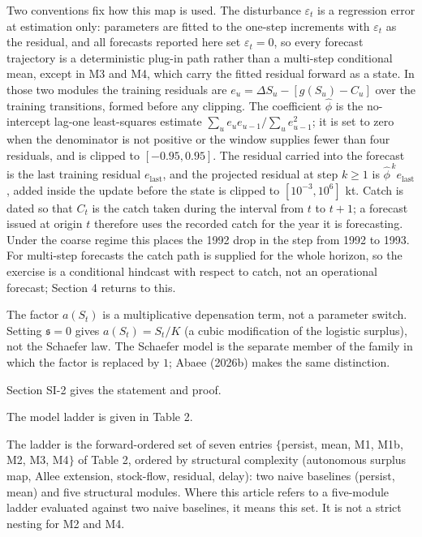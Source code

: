 \documentclass[11pt]{article}
\begin{document}
Two conventions fix how this map is used. The disturbance
\(\varepsilon_t\) is a regression error at estimation only: parameters
are fitted to the one-step increments with \(\varepsilon_t\) as the
residual, and all forecasts reported here set \(\varepsilon_t = 0\), so
every forecast trajectory is a deterministic plug-in path rather than a
multi-step conditional mean, except in M3 and M4, which carry the
fitted residual forward as a state. In those two modules the training residuals are
\(e_u = \Delta S_u - [g(S_u) - C_u]\) over the training transitions,
formed before any clipping. The coefficient \(\hat\phi\) is the
no-intercept lag-one least-squares estimate
\(\sum_u e_u e_{u-1}/\sum_u e_{u-1}^2\); it is set to zero when the
denominator is not positive or the window supplies fewer than four
residuals, and is clipped to \([-0.95, 0.95]\). The residual carried
into the forecast is the last training residual \(e_{\mathrm{last}}\),
and the projected residual at step \(k \ge 1\) is
\(\hat\phi^{\,k} e_{\mathrm{last}}\), added inside the update before
the state is clipped to \([10^{-3}, 10^{6}]\) kt.
Catch is dated so that \(C_t\) is the catch taken during the interval
from \(t\) to \(t+1\); a forecast issued at origin \(t\) therefore
uses the recorded catch for the year it is forecasting. Under the
coarse regime this places the 1992 drop in the step from 1992 to 1993.
For multi-step forecasts the catch path is supplied for the
whole horizon, so the exercise is a conditional hindcast with respect to
catch, not an operational forecast; Section 4 returns to this.

The factor \(a(S_t)\) is a multiplicative depensation term, not a
parameter switch. Setting \(\mathfrak s=0\) gives \(a(S_t)=S_t/K\) (a
cubic modification of the logistic surplus), not the Schaefer law. The
Schaefer model is the separate member of the family in which the factor
is replaced by \(1\); Abaee (2026b) makes the same distinction.

Section SI-2 gives the statement and proof.

The model ladder is given in Table 2.

The ladder is the forward-ordered set of seven entries \(\{\)persist,
mean, M1, M1b, M2, M3, M4\(\}\) of Table 2, ordered by structural
complexity (autonomous surplus map, Allee extension, stock-flow,
residual, delay): two naive baselines (persist, mean) and five
structural modules. Where this article refers to a five-module ladder
evaluated against two naive baselines, it means this set. It is not a
strict nesting for M2 and M4.
\end{document}
